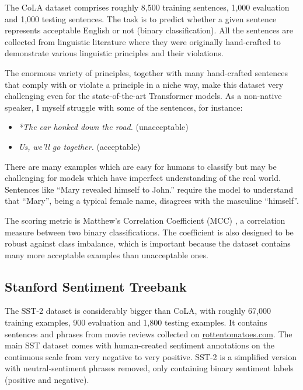 \documentclass[bsc,frontabs,twoside,singlespacing,parskip,deptreport]{infthesis}
\begin{document}
{{{      The CoLA dataset \citep{CoLA-paper} comprises roughly 8,500 training sentences, 1,000 evaluation and 1,000 testing sentences.
      The task is to predict whether a given sentence represents acceptable English or not (binary classification).
      All the sentences are collected from linguistic literature where they were originally hand-crafted to demonstrate various linguistic principles and their violations.
      
      The enormous variety of principles, together with many hand-crafted sentences that comply with or violate a principle in a niche way, make this dataset very challenging even for the state-of-the-art Transformer models. 
      As a non-native speaker, I myself struggle with some of the sentences, for instance:
      \begin{itemize}
        \item \textit{*The car honked down the road.} (unacceptable)
        \item \textit{Us, we'll go together.} (acceptable)
      \end{itemize}

      There are many examples which are easy for humans to classify but may be challenging for models which have imperfect understanding of the real world. Sentences like ``Mary revealed himself to John.'' require the model to understand that ``Mary'', being a typical female name, disagrees with the masculine ``himself''.
      
      The scoring metric is Matthew's Correlation Coefficient (MCC) \citep{Matthews_1975}, a correlation measure between two binary classifications. The coefficient is also designed to be robust against class imbalance, which is important because the dataset contains many more acceptable examples than unacceptable ones.
    }

    \subsection{Stanford Sentiment Treebank}{
      \label{sec:datasets-SST-2}

      The SST-2 dataset \citep{SST-paper} is considerably bigger than CoLA, with roughly 67,000 training examples, 900 evaluation and 1,800 testing examples. It contains sentences and phrases from movie reviews collected on \url{rottentomatoes.com}. The main SST dataset comes with human-created sentiment annotations on the continuous scale from very negative to very positive. SST-2 is a simplified version with neutral-sentiment phrases removed, only containing binary sentiment labels (positive and negative).

}}}
\end{document}
